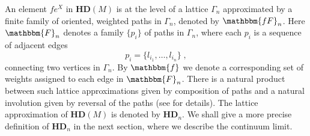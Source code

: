 \documentclass[12pt]{article}
\def\G{\Gamma}
\begin{document}

An element $f e^X$ in $\mathbf{HD}(M)$ is at the level of a lattice $\G_n$ approximated by a finite family of oriented, weighted paths in $\G_n$, denoted by  $\mathbbm{fF}_n$. %
Here $\mathbbm{F}_n$ denotes a family $\{ p_i\}$ of paths in $\G_n$, where each $p_i$ is a sequence of adjacent edges 
$$
p_i = \{l_{i_1}, \ldots,l_{i_n}\}\;,
$$
connecting two vertices in $\G_n$.
By $\mathbbm{f}$ we denote a corresponding set of weights assigned to each edge in $\mathbbm{F}_n$. There is a natural product between such lattice approximations given by composition of paths and a natural involution given by reversal of the paths (see \cite{Aastrup:2012vq} for details). The lattice approximation of $\mathbf{HD}(M)$ is denoted by $\mathbf{HD}_{n}$. We shall give a more precise definition of $\mathbf{HD}_{n}$ in the next section, where we describe the continuum limit.  %
\end{document}
